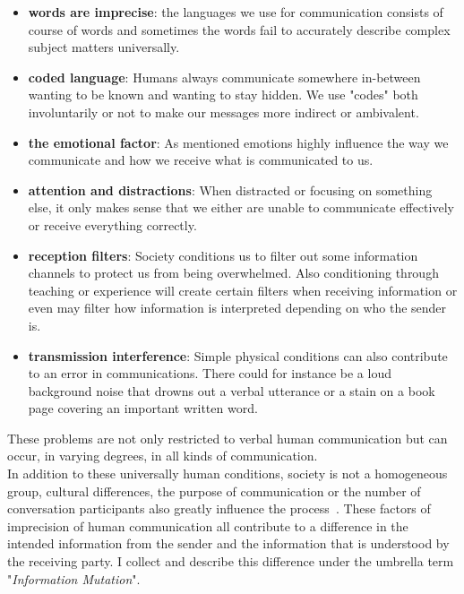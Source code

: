 \begin{itemize}
	\item \textbf{words are imprecise}: the languages we use for communication consists of course of words and sometimes the words fail to accurately describe complex subject matters universally.
	\item \textbf{coded language}: Humans always communicate somewhere in-between wanting to be known and wanting to stay hidden. We use "codes" both involuntarily or not to make our messages more indirect or ambivalent.
	\item \textbf{the emotional factor}: As mentioned emotions highly influence the way we communicate and how we receive what is communicated to us.
	\item \textbf{attention and distractions}: When distracted or focusing on something else, it only makes sense that we either are unable to communicate effectively or receive everything correctly.
	\item \textbf{reception filters}: Society conditions us to filter out some information channels to protect us from being overwhelmed. Also conditioning through teaching or experience will create certain filters when receiving information or even may filter how information is interpreted depending on who the sender is.
	\item \textbf{transmission interference}: Simple physical conditions can also contribute to an error in communications. There could for instance be a loud background noise that drowns out a verbal utterance or a stain on a book page covering an important written word.
\end{itemize}
These problems are not only restricted to verbal human communication but can occur, in varying degrees, in all kinds of communication.~\cite{Munsaka2014}\\
In addition to these universally human conditions, society is not a homogeneous group, cultural differences, the purpose of communication or the number of conversation participants also greatly influence the process~\cite{Chapanis1975}. These factors of imprecision of human communication all contribute to a difference in the intended information from the sender and the information that is understood by the receiving party. I collect and describe this difference under the umbrella term "\textit{Information Mutation}".
